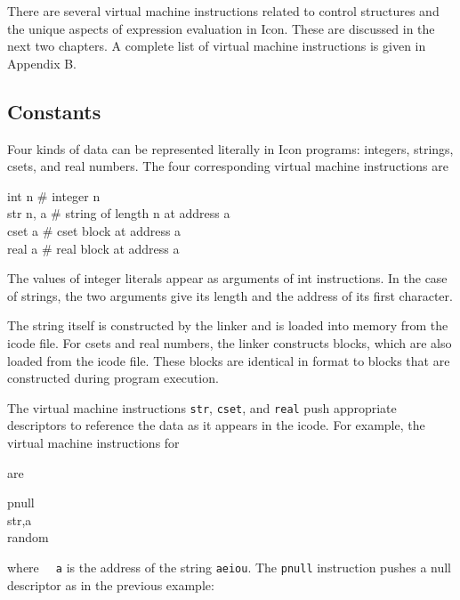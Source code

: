 There are several virtual machine instructions related to control
structures and the unique aspects of expression evaluation in
Icon. These are discussed in the next two chapters. A complete list of
virtual machine instructions is given in Appendix B.

\subsection{Constants}

Four kinds of data can be represented literally in Icon programs:
integers, strings, csets, and real numbers. The four corresponding
virtual machine instructions are

\begin{iconcode}
\>  int  \>\>\>  n \>   \>\>\>\# integer n\\
\>  str  \>\>\>  n,\> a \>\>\>\# string of length n at address a\\
\>  cset \>\>\>  a \>   \>\>\>\# cset block at address a\\
\>  real \>\>\>  a \>   \>\>\>\# real block at address a
\end{iconcode}

The values of integer literals appear as arguments of int
instructions. In the case of strings, the two arguments give its
length and the address of its first character.

The string itself is constructed by the linker and is loaded into
memory from the icode file. For csets and real numbers, the linker
constructs blocks, which are also loaded from the icode file. These
blocks are identical in format to blocks that are constructed during
program execution.

The virtual machine instructions \texttt{str}, \texttt{cset}, and
\texttt{real} push appropriate descriptors to reference the data as it
appears in the icode. For example, the virtual machine instructions
for


\noindent are

\begin{iconcode}
\>   pnull \\
\>   str\>\>,\>a \\
\>   random
\end{iconcode}

\noindent where \texttt{\ \ a} is the address of the string
\texttt{{\textquotedbl}aeiou{\textquotedbl}}. The \texttt{pnull}
instruction pushes a null descriptor as in the previous example:

